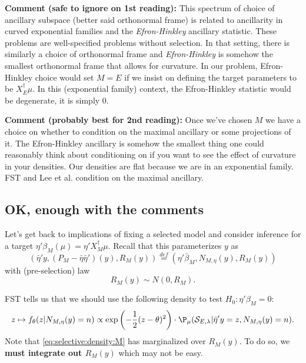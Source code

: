 \documentclass{article}
\newcommand{\OLS}{\bar{\beta}}
\begin{document}
        {\bf Comment (safe to ignore on 1st reading):} This spectrum of choice of
        ancillary subspace (better said orthonormal frame) is related
        to ancillarity in curved exponential families and the {\em
          Efron-Hinkley} ancillary statistic. These problems are
          well-specified problems without selection.  In that setting,
          there is similarly a choice of orthonormal frame and {\em
            Efron-Hinkley} is somehow the smallest orthonormal frame
          that allows for curvature. In our problem, Efron-Hinkley
          choice would set $M=E$ if we insist on defining the target
          parameters to be $X_E^{\dagger}\mu$. In this (exponential
          family) context, the Efron-Hinkley statistic would be
          degenerate, it is simply 0.

          {\bf Comment (probably best for 2nd reading):} Once we've
          chosen $M$ we have a choice on whether to condition on the
          maximal ancillary or some projections of it. The
          Efron-Hinkley ancillary is somehow the smallest thing one
          could reasonably think about conditioning on if you want to
          see the effect of curvature in your densities. Our densities
          are flat because we are in an exponential family. FST and
          Lee et al. condition on the maximal ancillary.

          \subsection{OK, enough with the comments}
        
          Let's get back to implications of fixing a selected model and consider
          inference for a target $\eta'\beta_M(\mu)=\eta'X_M^{\dagger}\mu$.
          Recall that this parameterizes $y$ as
          $$ \left(\bar{\eta}'y, (P_M-\bar{\eta}\bar{\eta}')(y), R_M(y)\right)
          \overset{def}{=} (\eta'\OLS_M, N_{M,\eta}(y), R_M(y))
          $$ with (pre-selection) law
          $$ R_M(y) \sim N(0, R_M).
          $$

          FST tells us that we should use the following density to test
          $H_0:\eta'\beta_M=0$:
        \begin{equation}
          \label{eq:selective:density:M}
        z \mapsto f_{\theta}(z | N_{M,\eta}(y)=n) \propto \exp
        \left(-\frac{1}{2}(z-\theta)^2 \right) \cdot \P_{\mu}({\cal
          S}_{E,\lambda} | \bar{\eta}'y=z, N_{M,\eta}(y)=n).
        \end{equation}
        Note that \eqref{eq:selective:density:M}  has marginalized
        over $R_M(y)$. To do so, we {\bf must integrate out $R_M(y)$}
        which may not be easy.
\end{document}
